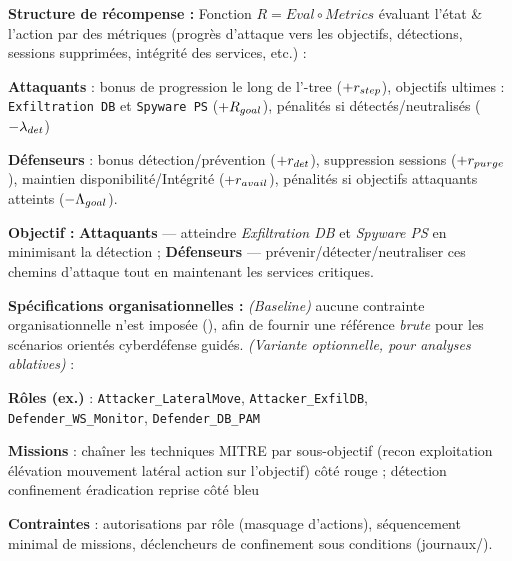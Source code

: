 \begin{enumerate*}[label={\roman*)}, itemjoin={; \quad}]
    \item \textbf{Structure de récompense :} Fonction $R = Eval \circ Metrics$ évaluant l’état \& l’action par des métriques (progrès d’attaque vers les objectifs, détections, sessions supprimées, intégrité des services, etc.) :
    \begin{enumerate*}[label={\alph*)}, itemjoin={; \ }]
        \item \textbf{Attaquants} : bonus de progression le long de l’-tree ($+r_{\small step}$), objectifs ultimes : \texttt{Exfiltration DB} et \texttt{Spyware PS} ($+R_{\small goal}$), pénalités si détectés/neutralisés ($-\lambda_{\small det}$)
        \item \textbf{Défenseurs} : bonus détection/prévention ($+r_{\small det}$), suppression sessions ($+r_{\small purge}$), maintien disponibilité/Intégrité ($+r_{\small avail}$), pénalités si objectifs attaquants atteints ($-\Lambda_{\small goal}$).
    \end{enumerate*}
    \item \textbf{Objectif :} \textbf{Attaquants} — atteindre \emph{Exfiltration DB} et \emph{Spyware PS} en minimisant la détection ; \textbf{Défenseurs} — prévenir/détecter/neutraliser ces chemins d’attaque tout en maintenant les services critiques.
\end{enumerate*}

\medskip
\textbf{Spécifications organisationnelles :} \emph{(Baseline)} aucune contrainte organisationnelle n’est imposée (\texttt{}), afin de fournir une référence \emph{brute} pour les scénarios orientés cyberdéfense guidés. \emph{(Variante optionnelle, pour analyses ablatives)} :
\begin{enumerate*}[label={\roman*)}, itemjoin={; \quad}]
    \item \textbf{Rôles (ex.)} : \texttt{Attacker\_LateralMove}, \texttt{Attacker\_ExfilDB}, \texttt{Defender\_WS\_Monitor}, \texttt{Defender\_DB\_PAM}
    \item \textbf{Missions} : chaîner les techniques MITRE par sous-objectif (recon \textrightarrow{} exploitation \textrightarrow{} élévation \textrightarrow{} mouvement latéral \textrightarrow{} action sur l’objectif) côté rouge ; détection \textrightarrow{} confinement \textrightarrow{} éradication \textrightarrow{} reprise côté bleu
    \item \textbf{Contraintes} : autorisations par rôle (masquage d’actions), séquencement minimal de missions, déclencheurs de confinement sous conditions (journaux/).
\end{enumerate*}

